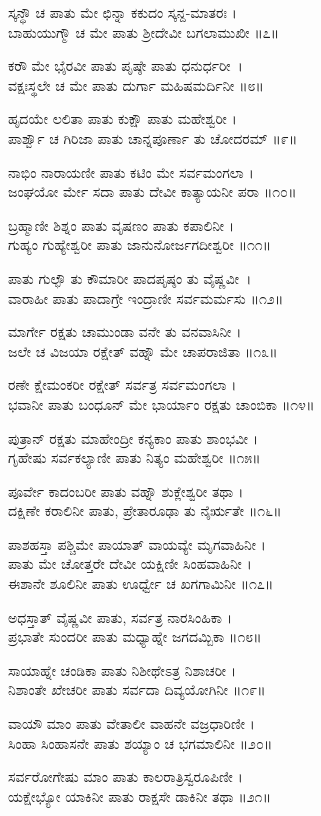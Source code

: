 ಸ್ಕನ್ಧೌ ಚ ಪಾತು ಮೇ ಛಿನ್ನಾ ಕಕುದಂ ಸ್ಕನ್ದ-ಮಾತರಃ ।\\
ಬಾಹುಯುಗ್ಮೌ ಚ ಮೇ ಪಾತು ಶ್ರೀದೇವೀ ಬಗಲಾಮುಖೀ ॥೭॥

ಕರೌ ಮೇ ಭೈರವೀ ಪಾತು ಪೃಷ್ಠೇ ಪಾತು ಧನುರ್ಧರೀ~।\\
ವಕ್ಷಃಸ್ಥಲೇ ಚ ಮೇ ಪಾತು ದುರ್ಗಾ ಮಹಿಷಮರ್ದಿನೀ ॥೮॥

ಹೃದಯೇ ಲಲಿತಾ ಪಾತು ಕುಕ್ಷೌ ಪಾತು ಮಹೇಶ್ವರೀ ।\\
ಪಾರ್ಶ್ವೌ ಚ ಗಿರಿಜಾ ಪಾತು ಚಾನ್ನಪೂರ್ಣಾ ತು ಚೋದರಮ್ ॥೯॥

ನಾಭಿಂ ನಾರಾಯಣೀ ಪಾತು ಕಟಿಂ ಮೇ ಸರ್ವಮಂಗಲಾ ।\\
ಜಂಘಯೋ ರ್ಮೇ ಸದಾ ಪಾತು ದೇವೀ ಕಾತ್ಯಾಯನೀ ಪರಾ ॥೧೦॥

ಬ್ರಹ್ಮಾಣೀ ಶಿಶ್ನಂ ಪಾತು ವೃಷಣಂ ಪಾತು ಕಪಾಲಿನೀ ।\\
ಗುಹ್ಯಂ ಗುಹ್ಯೇಶ್ವರೀ ಪಾತು ಜಾನುನೋರ್ಜಗದೀಶ್ವರೀ ॥೧೧॥

ಪಾತು ಗುಲ್ಫೌ ತು ಕೌಮಾರೀ ಪಾದಪೃಷ್ಠಂ ತು ವೈಷ್ಣವೀ~।\\
ವಾರಾಹೀ ಪಾತು ಪಾದಾಗ್ರೇ ಇಂದ್ರಾಣೀ ಸರ್ವಮರ್ಮಸು ॥೧೨॥

ಮಾರ್ಗೇ ರಕ್ಷತು ಚಾಮುಂಡಾ ವನೇ ತು ವನವಾಸಿನೀ ।\\
ಜಲೇ ಚ ವಿಜಯಾ ರಕ್ಷೇತ್ ವಹ್ನೌ ಮೇ ಚಾಪರಾಜಿತಾ ॥೧೩॥

ರಣೇ ಕ್ಷೇಮಂಕರೀ ರಕ್ಷೇತ್ ಸರ್ವತ್ರ ಸರ್ವಮಂಗಲಾ ।\\
ಭವಾನೀ ಪಾತು ಬಂಧೂನ್ ಮೇ ಭಾರ್ಯಾಂ ರಕ್ಷತು ಚಾಂಬಿಕಾ ॥೧೪॥

ಪುತ್ರಾನ್ ರಕ್ಷತು ಮಾಹೇಂದ್ರೀ ಕನ್ಯಕಾಂ ಪಾತು ಶಾಂಭವೀ ।\\
ಗೃಹೇಷು ಸರ್ವಕಲ್ಯಾಣೀ ಪಾತು ನಿತ್ಯಂ ಮಹೇಶ್ವರೀ ॥೧೫॥

ಪೂರ್ವೇ ಕಾದಂಬರೀ ಪಾತು ವಹ್ನೌ ಶುಕ್ಲೇಶ್ವರೀ ತಥಾ ।\\
ದಕ್ಷಿಣೇ ಕರಾಲಿನೀ ಪಾತು, ಪ್ರೇತಾರೂಢಾ ತು ನೈರ್ಋತೇ ॥೧೬॥

ಪಾಶಹಸ್ತಾ ಪಶ್ಚಿಮೇ ಪಾಯಾತ್ ವಾಯವ್ಯೇ ಮೃಗವಾಹಿನೀ ।\\
ಪಾತು ಮೇ ಚೋತ್ತರೇ ದೇವೀ ಯಕ್ಷಿಣೀ ಸಿಂಹವಾಹಿನೀ ।\\
ಈಶಾನೇ ಶೂಲಿನೀ ಪಾತು ಊರ್ಧ್ವೇ ಚ ಖಗಗಾಮಿನೀ ॥೧೭॥

ಅಧಸ್ತಾತ್ ವೈಷ್ಣವೀ ಪಾತು, ಸರ್ವತ್ರ ನಾರಸಿಂಹಿಕಾ ।\\
ಪ್ರಭಾತೇ ಸುಂದರೀ ಪಾತು ಮಧ್ಯಾಹ್ನೇ ಜಗದಮ್ಬಿಕಾ ॥೧೮॥

ಸಾಯಾಹ್ನೇ ಚಂಡಿಕಾ ಪಾತು ನಿಶೀಥೇಽತ್ರ ನಿಶಾಚರೀ ।\\
ನಿಶಾಂತೇ ಖೇಚರೀ ಪಾತು ಸರ್ವದಾ ದಿವ್ಯಯೋಗಿನೀ ॥೧೯॥

ವಾಯೌ ಮಾಂ ಪಾತು ವೇತಾಲೀ ವಾಹನೇ ವಜ್ರಧಾರಿಣೀ ।\\
ಸಿಂಹಾ ಸಿಂಹಾಸನೇ ಪಾತು ಶಯ್ಯಾಂ ಚ ಭಗಮಾಲಿನೀ ॥೨೦॥

ಸರ್ವರೋಗೇಷು ಮಾಂ ಪಾತು ಕಾಲರಾತ್ರಿಸ್ವರೂಪಿಣೀ ।\\
ಯಕ್ಷೇಭ್ಯೋ ಯಾಕಿನೀ ಪಾತು ರಾಕ್ಷಸೇ ಡಾಕಿನೀ ತಥಾ ॥೨೧॥

